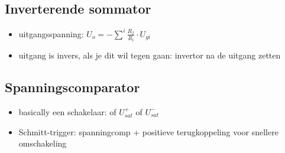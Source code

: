 \documentclass[11pt]{article}
\let\originalitem\item
\renewcommand{\item}{\originalitem[]}
\newcommand{\Newpage}{\end{preview}\begin{preview}}
\begin{document}
\begin{preview}
\Newpage
\section{Inverterende sommator}
\begin{itemize}
  \item uitgangsspanning: $ U_o = - \sum^i{\frac{R_f}{R_i}\cdot U_{gi}} $
  \item uitgang is invers, als je dit wil tegen gaan: invertor na de uitgang zetten
\end{itemize}


\Newpage
\section{Spanningscomparator}

\begin{itemize}
  \item basically een schakelaar: of $ U_{sat}^+ $ of $ U_{sat}^- $
  \item Schmitt-trigger: spanningcomp + positieve terugkoppeling voor snellere omschakeling
\end{itemize}


\end{preview}
\end{document}
